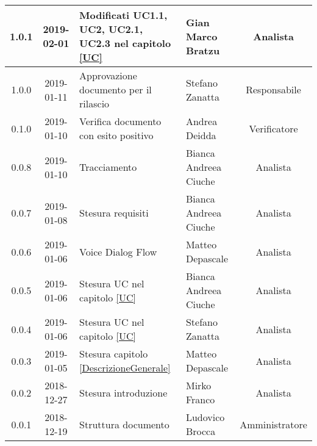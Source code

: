 \begin{center}
\begin{tabularx}{\textwidth}{|c|c|X|X|c|}
			\hline
			1.0.1 & 2019-02-01 & Modificati UC1.1, UC2, UC2.1, UC2.3 nel capitolo \ref{UC}& Gian Marco Bratzu & Analista\\
			\hline
			1.0.0 & 2019-01-11 & Approvazione documento per il rilascio& Stefano Zanatta & Responsabile\\
			\hline
			0.1.0 & 2019-01-10 & Verifica documento con esito positivo& Andrea Deidda & Verificatore\\
			\hline
			0.0.8 & 2019-01-10 & Tracciamento& Bianca Andreea Ciuche& Analista\\
			\hline
			0.0.7 & 2019-01-08 & Stesura requisiti & Bianca Andreea Ciuche& Analista\\
			\hline
			0.0.6 & 2019-01-06 & Voice Dialog Flow & Matteo Depascale & Analista\\
			\hline
			0.0.5 & 2019-01-06 & Stesura UC nel capitolo \ref{UC}& Bianca Andreea Ciuche & Analista\\
			\hline
			0.0.4 & 2019-01-06 & Stesura UC nel capitolo \ref{UC}& Stefano Zanatta & Analista\\
			\hline
			0.0.3 & 2019-01-05 & Stesura capitolo \ref{DescrizioneGenerale}& Matteo Depascale & Analista\\
			\hline
			0.0.2 & 2018-12-27 & Stesura introduzione & Mirko Franco & Analista\\
			\hline
			0.0.1 & 2018-12-19 & Struttura documento & Ludovico Brocca & Amministratore\\
			\hline
		\end{tabularx}
	\end{center}
\newpage